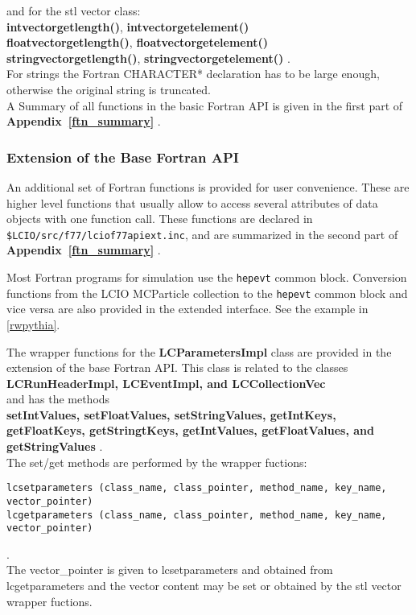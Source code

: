 and for the stl vector class:\\
{\bf intvectorgetlength()}, {\bf intvectorgetelement()}  \\
{\bf floatvectorgetlength()}, {\bf floatvectorgetelement()}  \\
{\bf stringvectorgetlength()}, {\bf stringvectorgetelement()} . \\

For strings the Fortran CHARACTER* declaration has to be large enough, otherwise the original
string is truncated.\\
A Summary of all functions in the basic Fortran API is given in the first part of {\bf Appendix~\ref{ftn_summary} }.


\subsubsection{Extension of the Base Fortran API} \label{f77ext}

An additional set of Fortran functions is provided for user convenience. These are higher level functions
that usually allow to access several attributes of data objects with one function call.
These functions are declared in \verb#$LCIO/src/f77/lciof77apiext.inc#,
and are summarized in the second part of {\bf Appendix~\ref{ftn_summary} }.

Most Fortran programs for simulation use the \verb$hepevt$ common block. 
Conversion functions from the LCIO MCParticle collection to the \verb$hepevt$ common block and vice versa 
are also provided in the extended interface. See the example in \ref{rwpythia}.

The wrapper functions for the {\bf LCParametersImpl} class are provided in the extension of the base Fortran API.
This class is related to the classes\\
{\bf LCRunHeaderImpl, LCEventImpl, and LCCollectionVec}\\
 and has the methods\\
{\bf setIntValues, setFloatValues, setStringValues, getIntKeys, getFloatKeys, getStringtKeys,
getIntValues, getFloatValues, and getStringValues} .\\

The set/get methods are performed by the wrapper fuctions:
\begin{verbatim}
lcsetparameters (class_name, class_pointer, method_name, key_name, vector_pointer) 
lcgetparameters (class_name, class_pointer, method_name, key_name, vector_pointer) 
\end{verbatim}
.    \\
The vector\_pointer is given to lcsetparameters and obtained from lcgetparameters and the vector content
may be set or obtained by the stl vector wrapper fuctions.

